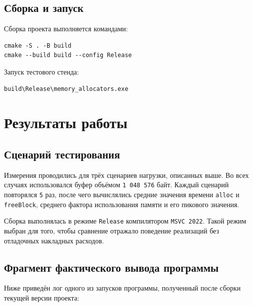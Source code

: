 \documentclass[unicode, 12pt, a4paper, oneside, fleqn]{article}
\begin{document}
\subsection{Сборка и запуск}

Сборка проекта выполняется командами:

\begin{lstlisting}
cmake -S . -B build
cmake --build build --config Release
\end{lstlisting}

Запуск тестового стенда:

\begin{lstlisting}
build\Release\memory_allocators.exe
\end{lstlisting}

\section{Результаты работы}

\subsection{Сценарий тестирования}

Измерения проводились для трёх сценариев нагрузки, описанных выше. Во всех случаях использовался буфер объёмом \texttt{1 048 576} байт. Каждый сценарий повторялся \texttt{5} раз, после чего вычислялись средние значения времени \texttt{alloc} и \texttt{freeBlock}, среднего фактора использования памяти и его пикового значения.

Сборка выполнялась в режиме \texttt{Release} компилятором \texttt{MSVC 2022}. Такой режим выбран для того, чтобы сравнение отражало поведение реализаций без отладочных накладных расходов.

\subsection{Фрагмент фактического вывода программы}

Ниже приведён лог одного из запусков программы, полученный после сборки текущей версии проекта:
\end{document}
